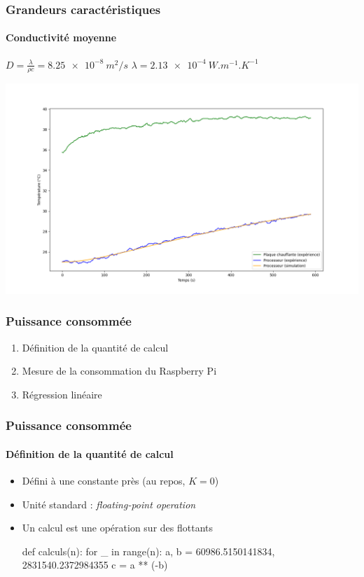 \documentclass[a4paper,11pt]{beamer}
\begin{document}
\begin{frame}
    \frametitle{Grandeurs caractéristiques}
    \framesubtitle{Conductivité moyenne}

    $D = \frac{\lambda}{\rho c} = \SI{8.25e-8}{m^2/s}$ \hfill $\lambda = \SI{2.13e-4}{W.m^{-1}.K^{-1}}$

    \includegraphics[width=\textwidth]{d_simulation.png}
\end{frame}

\begin{frame}
    \frametitle{Puissance consommée}

    \begin{enumerate}
        \item Définition de la quantité de calcul
        \item Mesure de la consommation du Raspberry Pi
        \item Régression linéaire
    \end{enumerate}
\end{frame}

\begin{frame}[fragile]
    \frametitle{Puissance consommée}
    \framesubtitle{Définition de la quantité de calcul}

    \begin{itemize}
        \item Défini à une constante près (au repos, $K = 0$)
        \item Unité standard : \textit{floating-point operation}
        \item Un calcul est une opération sur des flottants
        \begin{python}
def calculs(n):
    for _ in range(n):
        a, b = 60986.5150141834, 2831540.2372984355
        c = a ** (-b)
        \end{python}
    \end{itemize}
\end{frame}
\end{document}
